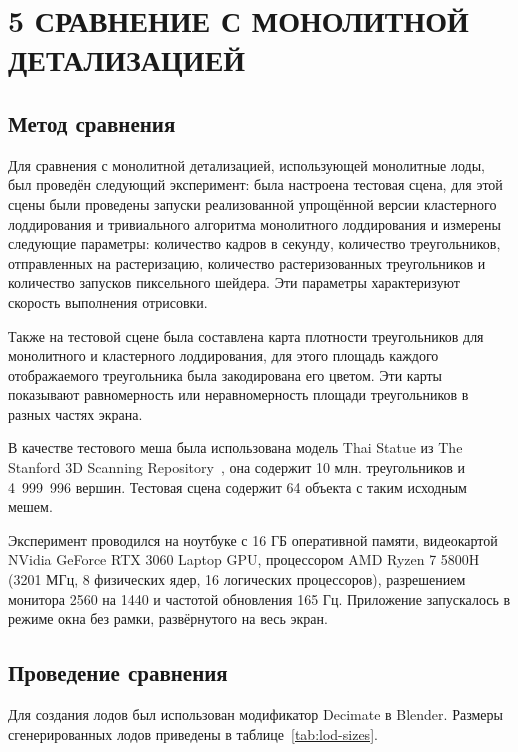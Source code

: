 \clearpage
\section{5 СРАВНЕНИЕ С МОНОЛИТНОЙ ДЕТАЛИЗАЦИЕЙ}
\subsection*{Метод сравнения}
Для сравнения с монолитной детализацией, использующей монолитные лоды, был проведён следующий эксперимент: была настроена тестовая сцена, для этой сцены были проведены запуски реализованной упрощённой версии кластерного лоддирования и тривиального алгоритма монолитного лоддирования и измерены следующие параметры: количество кадров в секунду, количество треугольников, отправленных на растеризацию, количество растеризованных треугольников и количество запусков пиксельного шейдера.
Эти параметры характеризуют скорость выполнения отрисовки.

Также на тестовой сцене была составлена карта плотности треугольников для монолитного и кластерного лоддирования, для этого площадь каждого отображаемого треугольника была закодирована его цветом.
Эти карты показывают равномерность или неравномерность площади треугольников в разных частях экрана.

В качестве тестового меша была использована модель Thai Statue из The Stanford 3D Scanning Repository~\cite{StanfordRepo}, она содержит 10 млн. треугольников и 4~999~996 вершин.
Тестовая сцена содержит 64 объекта с таким исходным мешем.

Эксперимент проводился на ноутбуке с 16 ГБ оперативной памяти, видеокартой NVidia GeForce RTX 3060 Laptop GPU, процессором AMD Ryzen 7 5800H (3201 МГц, 8 физических ядер, 16 логических процессоров), разрешением монитора 2560 на 1440 и частотой обновления 165 Гц.
Приложение запускалось в режиме окна без рамки, развёрнутого на весь экран.

\subsection*{Проведение сравнения}
Для создания лодов был использован модификатор Decimate в Blender.
Размеры сгенерированных лодов приведены в таблице~\ref{tab:lod-sizes}.

